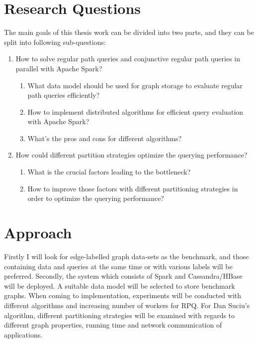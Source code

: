 \section{Research Questions}
The main goals of this thesis work can be divided into two parts, and they can be split into following sub-questions:
\begin{enumerate}
\item How to solve regular path queries and conjunctive regular path queries in parallel with Apache Spark?
    \begin{enumerate}
    \item What data model should be used for graph storage to evaluate regular path queries efficiently?
    \item How to implement distributed algorithms for efficient query evaluation with Apache Spark?
    \item What's the pros and cons for different algorithms?
    \end{enumerate}
\item How could different partition strategies optimize the querying performance?
\begin{enumerate}
    \item What is the crucial factors leading to the bottleneck? 
    \item How to improve those factors with different partitioning strategies in order to optimize the querying performance?
\end{enumerate}
\end{enumerate}

\section{Approach}
Firstly I will look for edge-labelled graph data-sets as the benchmark, and those containing data and queries at the same time or with various labels will be preferred. Secondly, the system which consists of Spark and Cassandra/HBase will be deployed. A suitable data model will be selected to store benchmark graphs. When coming to implementation, experiments will be conducted with different algorithms and increasing number of workers for RPQ. For Dan Suciu's algorithm, different partitioning strategies will be examined with regards to different graph properties, running time and network communication of applications.


